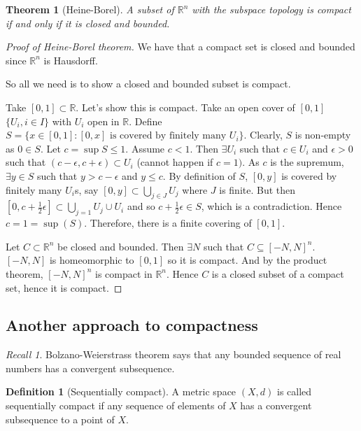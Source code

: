 \documentclass{article}
\theoremstyle{definition}
\newtheorem{defn}{Definition}[section]
\theoremstyle{plain}%
\newtheorem{thm}{Theorem}[section]
\theoremstyle{remark}
\newtheorem*{rec}{Recall}
\newcommand{\union}{\cup}
\newcommand{\Union}{\bigcup}
\newcommand{\R}{\mathbb{R}}
\begin{document}
\begin{thm}[Heine-Borel]
    A subset of $\R^n$ with the subspace topology is compact if and only if it is closed and bounded.
\end{thm}


\begin{proof}[Proof of Heine-Borel theorem]
    We have that a compact set is closed and bounded since $\R^n$ is Hausdorff.
    
    So all we need is to show a closed and bounded subset is compact.
    
    Take $[0,1] \subset \R$. Let's show this is compact. Take an open cover of $[0,1]$ $\{U_i, i \in I\}$ with $U_i$ open in $\R$. Define $S = \{x \in [0,1] : [0,x] \text{ is covered by finitely many } U_i\}$. Clearly, $S$ is non-empty as $0 \in S$. Let $c = \sup S \le 1$. Assume $c < 1$. Then $\exists U_i$ such that $c \in U_i$ and $\epsilon > 0$ such that $(c-\epsilon, c+\epsilon) \subset U_i$ (cannot happen if $c = 1)$. As $c$ is the supremum, $\exists y \in S$ such that $y > c -\epsilon$ and $y \le c$. By definition of $S$, $[0,y]$ is covered by finitely many $U_i$s, say $[0,y] \subset \Union_{j \in J} U_j$ where $J$ is finite. But then $[0, c + \frac{1}{2}\epsilon] \subset \Union_{j=1} U_j \union U_i$ and so $c + \frac{1}{2}\epsilon \in S$, which is a contradiction. Hence $c = 1 = \sup(S)$. Therefore, there is a finite covering of $[0,1]$.
    
    Let $C \subset \R^n$ be closed and bounded. Then $\exists N$ such that $C \subseteq [-N, N]^n$. $[-N, N]$ is homeomorphic to $[0,1]$ so it is compact. And by the product theorem, $[-N,N]^n$ is compact in $\R^n$. Hence $C$ is a closed subset of a compact set, hence it is compact.
\end{proof}

\subsection{Another approach to compactness}

\begin{rec}
    Bolzano-Weierstrass theorem says that any bounded sequence of real numbers has a convergent subsequence.
\end{rec}

\begin{defn}[Sequentially compact]
    A metric space $(X,d)$ is called sequentially compact if any sequence of elements of $X$ has a convergent subsequence to a point of $X$.
\end{defn}
\end{document}
